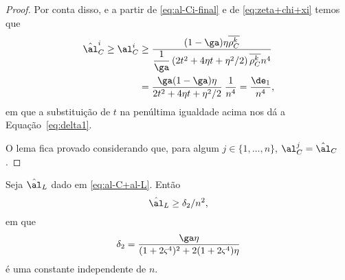 \begin{proof}
Por conta disso, e a partir  de \eqref{eq:al-Ci-final} e de \eqref{eq:zeta+chi+xi} temos que 
\[
\begin{aligned}
\nextal_{C}^i \geq \al_{C}^{i} & \geq \dfrac{(1-\ga)\eta\rhoCkb}{\dfrac{1}{\ga}\left( 2t^{2} + 4\eta t + \eta^{2}/2 \right)\rhoCkb n^{4} } \\			 
							& = \dfrac{\ga(1-\ga)\eta}{ 2t^{2} + 4\eta t + \eta^{2}/2 } \:\dfrac{1}{n^{4}} = \dfrac{\de_{1}}{n^{4}},
\end{aligned}
\]
em que a substituição de $t$ na penúltima igualdade acima nos dá a Equação~\eqref{eq:delta1}.

 O lema fica provado considerando que, para algum $j\in\{1,\ldots,n\}$, $ \al_{C}^{j}=\nextal_{C} $.
 \end{proof}






\begin{lema}\label{lemma:alL_delta-2}
Seja $\nextal_{L}$ dado em \eqref{eq:al-C+al-L}. Então 
\[
\nextal_{L} \geq \delta_{2}/n^{2},
\]em que 
\begin{equation}
	\label{eq:delta2}
	\delta_{2} = \dfrac{\ga\eta } {(1 + 2\bdxzstar^{4})^{2}  + 2(1+2\bdxzstar^{4})\eta}
\end{equation}
é uma constante independente de $n$.
\end{lema}



